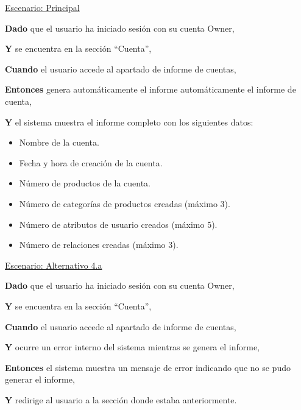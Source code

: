 \underline{Escenario: Principal}\par
\vspace{0.15cm}
\textbf{Dado} que el usuario ha iniciado sesión con su cuenta Owner,\par
\textbf{Y} se encuentra en la sección \enquote{Cuenta},\par
\textbf{Cuando} el usuario accede al apartado de informe de cuentas,\par
\textbf{Entonces} genera automáticamente el informe automáticamente el informe de cuenta,\par 
\textbf{Y} el sistema muestra el informe completo con los siguientes datos:\par
\begin{itemize}
    \item Nombre de la cuenta.
    \item Fecha y hora de creación de la cuenta.
    \item Número de productos de la cuenta.
    \item Número de categorías de productos creadas (máximo 3).
    \item Número de atributos de usuario creados (máximo 5).
    \item Número de relaciones creadas (máximo 3).
\end{itemize}
\vspace{0.20cm}


\underline{Escenario: Alternativo 4.a}\par
\vspace{0.15cm}
\textbf{Dado} que el usuario ha iniciado sesión con su cuenta Owner,\par
\textbf{Y} se encuentra en la sección \enquote{Cuenta},\par
\textbf{Cuando} el usuario accede al apartado de informe de cuentas,\par 
\textbf{Y} ocurre un error interno del sistema mientras se genera el informe,\par
\textbf{Entonces} el sistema muestra un mensaje de error indicando que no se pudo generar el informe,\par
\textbf{Y} redirige al usuario a la sección donde estaba anteriormente.\par
\vspace{0.20cm}

\newpage %

